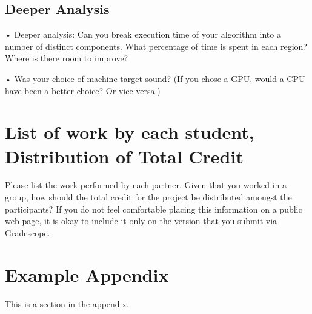 \documentclass[11pt]{article}
\begin{document}
\subsection{Deeper Analysis}
• Deeper analysis: Can you break execution time of your algorithm into a number of distinct components. What percentage of time is spent in each region? Where is there room to improve?

• Was your choice of machine target sound? (If you chose a GPU, would a CPU have been a better choice? Or vice versa.)

\section{List of work by each student, Distribution of Total Credit}
Please list the work performed by each partner. Given that you worked in a
group, how should the total credit for the project be distributed amongst the participants? If you do not feel comfortable placing this information on a public web page, it is okay to include it only on the version that you submit via Gradescope.





\appendix

\section{Example Appendix}
\label{sec:appendix}

This is a section in the appendix.
\end{document}
